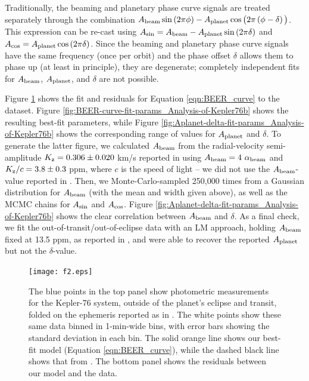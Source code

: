 \documentclass[manuscript]{aastex62}
\begin{document}
Traditionally, the beaming and planetary phase curve signals are treated separately through the combination $A_{\rm beam} \sin \left(2 \pi\phi \right) - A_{\rm planet} \cos \big(2\pi \left( \phi - \delta \right)\big)$. This expression can be re-cast using $A_{\rm sin} = A_{\rm beam} - A_{\rm planet} \sin \left( 2 \pi \delta \right)$ and $A_{\rm cos} = A_{\rm planet} \cos \left( 2 \pi \delta \right)$. Since the beaming and planetary phase curve signals have the same frequency (once per orbit) and the phase offset $\delta$ allows them to phase up (at least in principle), they are degenerate; completely independent fits for $A_{\rm beam}$, $A_{\rm planet}$, and $\delta$ are not possible.

Figure \ref{fig:BEER-curve-fit_Analysis_of_Kepler76b} shows the fit and residuals for Equation \ref{eqn:BEER_curve} to the dataset. Figure \ref{fig:BEER-curve-fit-params_Analysis-of-Kepler76b} shows the resulting best-fit parameters, while Figure \ref{fig:Aplanet-delta-fit-params_Analysis-of-Kepler76b} shows the corresponding range of values for $A_{\rm planet}$ and $\delta$. To generate the latter figure, we calculated $A_{\rm beam}$ from the radial-velocity semi-amplitude $K_{\rm z} = 0.306 \pm 0.020$ km/s reported in \citet{2013ApJ...771...26F} using $A_{\rm beam} = 4\ \alpha_{\rm beam}$ and $K_{\rm z}/c = 3.8 \pm 0.3$ ppm, where $c$ is the speed of light \citep{2003ApJ...588L.117L} -- we did not use the $A_{\rm beam}$-value reported in \citet{2013ApJ...771...26F}. Then, we Monte-Carlo-sampled 250,000 times from a Gaussian distribution for $A_{\rm beam}$ (with the mean and width given above), as well as the MCMC chains for $A_{\rm sin}$ and $A_{\rm cos}$. Figure \ref{fig:Aplanet-delta-fit-params_Analysis-of-Kepler76b} shows the clear correlation between $A_{\rm beam}$ and $\delta$. As a final check, we fit the out-of-transit/out-of-eclipse data with an LM approach, holding $A_{\rm beam}$ fixed at 13.5 ppm, as reported in \citet{2013ApJ...771...26F}, and were able to recover the reported $A_{\rm planet}$ but not the $\delta$-value. 

\begin{figure}
\texttt{[image: f2.eps]}
\caption{The blue points in the top panel show photometric measurements for the Kepler-76 system, outside of the planet's eclipse and transit, folded on the ephemeris reported as in \citet{2013ApJ...771...26F}. The white points show these same data binned in 1-min-wide bins, with error bars showing the standard deviation in each bin. The solid orange line shows our best-fit model (Equation \ref{eqn:BEER_curve}), while the dashed black line shows that from \citet{2013ApJ...771...26F}. The bottom panel shows the residuals between our model and the data.\label{fig:BEER-curve-fit_Analysis_of_Kepler76b}}
\end{figure}
\end{document}
